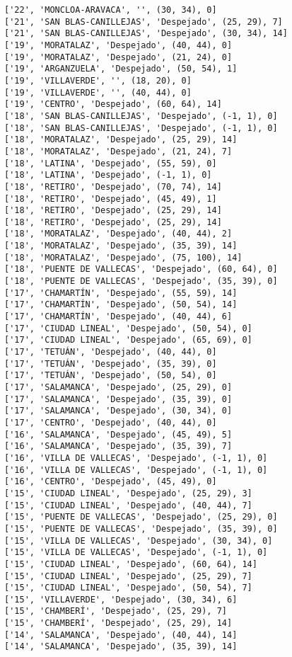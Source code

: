 \documentclass[11pt]{article}
\begin{document}
\begin{Verbatim}[commandchars=\\\{\}]
['22', 'MONCLOA-ARAVACA', '', (30, 34), 0]
['21', 'SAN BLAS-CANILLEJAS', 'Despejado', (25, 29), 7]
['21', 'SAN BLAS-CANILLEJAS', 'Despejado', (30, 34), 14]
['19', 'MORATALAZ', 'Despejado', (40, 44), 0]
['19', 'MORATALAZ', 'Despejado', (21, 24), 0]
['19', 'ARGANZUELA', 'Despejado', (50, 54), 1]
['19', 'VILLAVERDE', '', (18, 20), 0]
['19', 'VILLAVERDE', '', (40, 44), 0]
['19', 'CENTRO', 'Despejado', (60, 64), 14]
['18', 'SAN BLAS-CANILLEJAS', 'Despejado', (-1, 1), 0]
['18', 'SAN BLAS-CANILLEJAS', 'Despejado', (-1, 1), 0]
['18', 'MORATALAZ', 'Despejado', (25, 29), 14]
['18', 'MORATALAZ', 'Despejado', (21, 24), 7]
['18', 'LATINA', 'Despejado', (55, 59), 0]
['18', 'LATINA', 'Despejado', (-1, 1), 0]
['18', 'RETIRO', 'Despejado', (70, 74), 14]
['18', 'RETIRO', 'Despejado', (45, 49), 1]
['18', 'RETIRO', 'Despejado', (25, 29), 14]
['18', 'RETIRO', 'Despejado', (25, 29), 14]
['18', 'MORATALAZ', 'Despejado', (40, 44), 2]
['18', 'MORATALAZ', 'Despejado', (35, 39), 14]
['18', 'MORATALAZ', 'Despejado', (75, 100), 14]
['18', 'PUENTE DE VALLECAS', 'Despejado', (60, 64), 0]
['18', 'PUENTE DE VALLECAS', 'Despejado', (35, 39), 0]
['17', 'CHAMARTÍN', 'Despejado', (55, 59), 14]
['17', 'CHAMARTÍN', 'Despejado', (50, 54), 14]
['17', 'CHAMARTÍN', 'Despejado', (40, 44), 6]
['17', 'CIUDAD LINEAL', 'Despejado', (50, 54), 0]
['17', 'CIUDAD LINEAL', 'Despejado', (65, 69), 0]
['17', 'TETUÁN', 'Despejado', (40, 44), 0]
['17', 'TETUÁN', 'Despejado', (35, 39), 0]
['17', 'TETUÁN', 'Despejado', (50, 54), 0]
['17', 'SALAMANCA', 'Despejado', (25, 29), 0]
['17', 'SALAMANCA', 'Despejado', (35, 39), 0]
['17', 'SALAMANCA', 'Despejado', (30, 34), 0]
['17', 'CENTRO', 'Despejado', (40, 44), 0]
['16', 'SALAMANCA', 'Despejado', (45, 49), 5]
['16', 'SALAMANCA', 'Despejado', (35, 39), 7]
['16', 'VILLA DE VALLECAS', 'Despejado', (-1, 1), 0]
['16', 'VILLA DE VALLECAS', 'Despejado', (-1, 1), 0]
['16', 'CENTRO', 'Despejado', (45, 49), 0]
['15', 'CIUDAD LINEAL', 'Despejado', (25, 29), 3]
['15', 'CIUDAD LINEAL', 'Despejado', (40, 44), 7]
['15', 'PUENTE DE VALLECAS', 'Despejado', (25, 29), 0]
['15', 'PUENTE DE VALLECAS', 'Despejado', (35, 39), 0]
['15', 'VILLA DE VALLECAS', 'Despejado', (30, 34), 0]
['15', 'VILLA DE VALLECAS', 'Despejado', (-1, 1), 0]
['15', 'CIUDAD LINEAL', 'Despejado', (60, 64), 14]
['15', 'CIUDAD LINEAL', 'Despejado', (25, 29), 7]
['15', 'CIUDAD LINEAL', 'Despejado', (50, 54), 7]
['15', 'VILLAVERDE', 'Despejado', (30, 34), 6]
['15', 'CHAMBERÍ', 'Despejado', (25, 29), 7]
['15', 'CHAMBERÍ', 'Despejado', (25, 29), 14]
['14', 'SALAMANCA', 'Despejado', (40, 44), 14]
['14', 'SALAMANCA', 'Despejado', (35, 39), 14]

\end{Verbatim}
\end{document}
